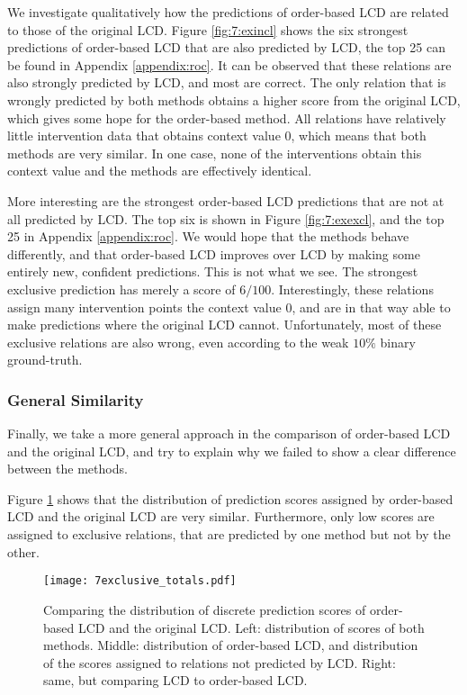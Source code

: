 We investigate qualitatively how the predictions of order-based LCD are related to those of the original LCD. Figure \ref{fig:7:exincl} shows the six strongest predictions of order-based LCD that are also predicted by LCD, the top 25 can be found in Appendix \ref{appendix:roc}. It can be observed that these relations are also strongly predicted by LCD, and most are correct. The only relation that is wrongly predicted by both methods obtains a higher score from the original LCD, which gives some hope for the order-based method. All relations have relatively little intervention data that obtains context value $0$, which means that both methods are very similar. In one case, none of the interventions obtain this context value and the methods are effectively identical. 

More interesting are the strongest order-based LCD predictions that are not at all predicted by LCD. The top six is shown in Figure \ref{fig:7:exexcl}, and the top 25 in Appendix \ref{appendix:roc}. We would hope that the methods behave differently, and that order-based LCD improves over LCD by making some entirely new, confident predictions. This is not what we see. The strongest exclusive prediction has merely a score of $6/100$. Interestingly, these relations assign many intervention points the context value $0$, and are in that way able to make predictions where the original LCD cannot. Unfortunately, most of these exclusive relations are also wrong, even according to the weak $10\%$ binary ground-truth. 


\subsubsection{General Similarity}

Finally, we take a more general approach in the comparison of order-based LCD and the original LCD, and try to explain why we failed to show a clear difference between the methods. 

Figure \ref{fig:7:excltotals} shows that the distribution of prediction scores assigned by order-based LCD and the original LCD are very similar. Furthermore, only low scores are assigned to exclusive relations, that are predicted by one method but not by the other. 

\begin{figure}[h]
    \centering
    \texttt{[image: 7exclusive\_totals.pdf]}
    \caption{Comparing the distribution of discrete prediction scores of order-based LCD and the original LCD. Left: distribution of scores of both methods. Middle: distribution of order-based LCD, and distribution of the scores assigned to relations not predicted by LCD. Right: same, but comparing LCD to order-based LCD.}
    \label{fig:7:excltotals}
\end{figure}

